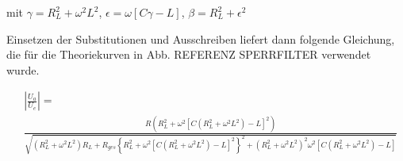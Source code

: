 mit $\gamma=R_L^2+\omega^2L^2$, $\epsilon=\omega[C\gamma-L]$, $\beta=R_L^2 + \epsilon^2$

Einsetzen der Substitutionen und Ausschreiben liefert dann folgende Gleichung, die für die Theoriekurven in Abb. REFERENZ SPERRFILTER verwendet wurde.

\footnotesize
\begin{align}
&\left| \frac{U_a}{U_e} \right| =  \\
&\frac{R\left(R^2_L+\omega ^2\left[C\left(R^2_L+\omega ^2 L^2 \right) - L\right] ^2 \right)}{\sqrt{ \left( R^2_L + \omega ^2L^2\right) R_L+R_{ges}\left\{ R_L^2+\omega ^2\left[ C\left( R_L^2+\omega ^2L^2\right) -L\right] ^2\right\}^2+\left(R^2_L+\omega^2L^2\right)^2\omega^2\left[C\left(R^2_L+\omega^2L^2\right)-L\right]}}\nonumber
\end{align}
\normalsize
